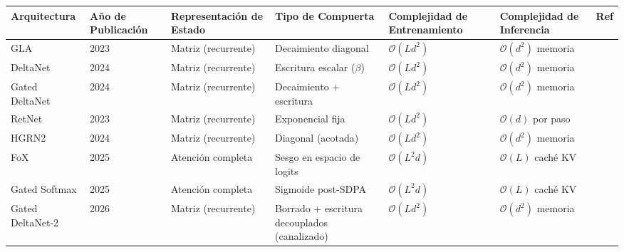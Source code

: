 \documentclass[11pt,a4paper]{article}
\begin{document}
\footnotesize
\begin{longtable}{p{1.8cm}p{1.7cm}p{1.8cm}p{1.6cm}p{2.0cm}p{2.4cm}p{1.3cm}}
\toprule
\textbf{Arquitectura} & \textbf{Año de Publicación} & \textbf{Representación de Estado} & \textbf{Tipo de Compuerta} & \textbf{Complejidad de Entrenamiento} & \textbf{Complejidad de Inferencia} & \textbf{Ref} \\
\midrule
\endhead
GLA & 2023 & Matriz (recurrente) & Decaimiento diagonal & $\mathcal{O}(Ld^2)$ & $\mathcal{O}(d^2)$ memoria & \citep{yang_gla_2023} \\
DeltaNet & 2024 & Matriz (recurrente) & Escritura escalar ($\beta$) & $\mathcal{O}(Ld^2)$ & $\mathcal{O}(d^2)$ memoria & \citep{yang_deltanet_2024} \\
Gated DeltaNet & 2024 & Matriz (recurrente) & Decaimiento + escritura & $\mathcal{O}(Ld^2)$ & $\mathcal{O}(d^2)$ memoria & \citep{yang_gated_deltanet_2024} \\
RetNet & 2023 & Matriz (recurrente) & Exponencial fija & $\mathcal{O}(Ld^2)$ & $\mathcal{O}(d)$ por paso & \citep{sun_retentive_2023} \\
HGRN2 & 2024 & Matriz (recurrente) & Diagonal (acotada) & $\mathcal{O}(Ld^2)$ & $\mathcal{O}(d^2)$ memoria & \citep{qin_hgrn2_2024} \\
FoX & 2025 & Atención completa & Sesgo en espacio de logits & $\mathcal{O}(L^2d)$ & $\mathcal{O}(L)$ caché KV & \citep{lin_forgetting_transformer_2025} \\
Gated Softmax & 2025 & Atención completa & Sigmoide post-SDPA & $\mathcal{O}(L^2d)$ & $\mathcal{O}(L)$ caché KV & \citep{qiu_gated_attention_2025} \\
Gated DeltaNet-2 & 2026 & Matriz (recurrente) & Borrado + escritura decouplados (canalizado) & $\mathcal{O}(Ld^2)$ & $\mathcal{O}(d^2)$ memoria & \citep{hatamizadeh_gated_deltanet2_2026} \\
\bottomrule
\end{longtable}
\normalsize

\medskip
\end{document}
